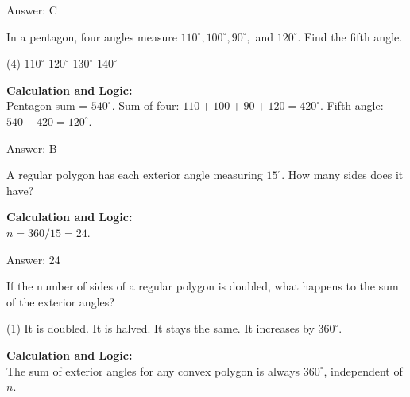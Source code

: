 \documentclass[11pt,paper=a4,answers]{exam}
\begin{document}
\begin{questions}
\begin{solution}
\vspace{30pt}

Answer: \colorbox{yellow!100}{C}
\end{solution}

\vspace{60pt}

\question
In a pentagon, four angles measure $110^\circ, 100^\circ, 90^\circ,$ and $120^\circ$. Find the fifth angle.
\begin{tasks}(4)
    \task $110^\circ$
    \task $120^\circ$
    \task $130^\circ$
    \task $140^\circ$
\end{tasks}

\begin{solution}
\textbf{Calculation and Logic:} \\
Pentagon sum = $540^\circ$. Sum of four: $110 + 100 + 90 + 120 = 420^\circ$. Fifth angle: $540 - 420 = 120^\circ$.

\vspace{30pt}

Answer: \colorbox{yellow!100}{B}
\end{solution}

\vspace{60pt}

\question
A regular polygon has each exterior angle measuring $15^\circ$. How many sides does it have?

\begin{solution}
\textbf{Calculation and Logic:} \\
$n = 360 / 15 = 24$.

\vspace{30pt}

Answer: \colorbox{yellow!100}{24}
\end{solution}

\vspace{60pt}

\question
If the number of sides of a regular polygon is doubled, what happens to the sum of the exterior angles?
\begin{tasks}(1)
    \task It is doubled.
    \task It is halved.
    \task It stays the same.
    \task It increases by $360^\circ$.
\end{tasks}

\begin{solution}
\textbf{Calculation and Logic:} \\
The sum of exterior angles for any convex polygon is always $360^\circ$, independent of $n$.


\end{solution}
\end{questions}
\end{document}
